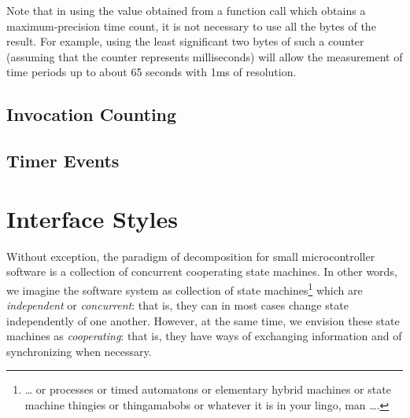 Note that in using the value obtained from a function call
which obtains a maximum-precision time count, it is not
necessary to use all the bytes of the result.  For example,
using the least significant two bytes of such a counter
(assuming that the counter represents milliseconds) will
allow the measurement of time periods up to about 65 seconds
with 1ms of resolution.


\subsection{Invocation Counting}
\label{cpco0:smot0:sicn0}



\subsection{Timer Events}
\label{cpco0:smot0:stev0}



\section{Interface Styles}
\label{cpco0:sist0}

Without exception, the paradigm of decomposition for small microcontroller
software is a collection of concurrent cooperating state machines.  In other
words, we imagine
the software system as collection of state machines\footnote{\ldots{} or processes or 
timed automatons or elementary hybrid machines or state machine thingies
or thingamabobs or whatever it is in your lingo, man \ldots{}.} which are
\emph{independent} or \emph{concurrent}:  that is, they can in most 
cases change state independently
of one another.  However, at the same time, we envision these
state machines as \emph{cooperating}:  that is, they have ways 
of exchanging information and of synchronizing when necessary.

